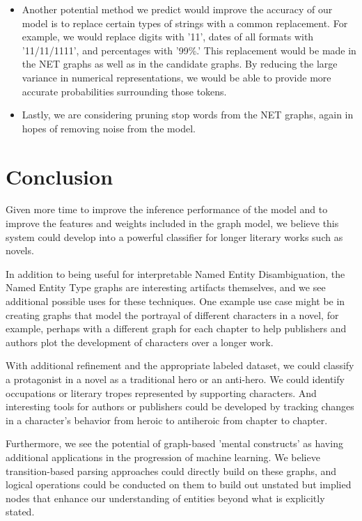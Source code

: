 \documentclass[11pt,a4paper]{article}
\begin{document}
\begin{itemize}
\item Another potential method we predict would improve the accuracy of our model is to replace certain types of strings with a common replacement. For example, we would replace digits with '11', dates of all formats with '11/11/1111', and percentages with '99\%.' This replacement would be made in the NET graphs as well as in the candidate graphs. By reducing the large variance in numerical representations, we would be able to provide more accurate probabilities surrounding those tokens.

\item Lastly, we are considering pruning stop words from the NET graphs, again in hopes of removing noise from the model.

\end{itemize}

\section{Conclusion}

Given more time to improve the inference performance of the model and to improve the features and weights included in the graph model, we believe this system could develop into a powerful classifier for longer literary works such as novels.

In addition to being useful for interpretable Named Entity Disambiguation, the Named Entity Type graphs are interesting artifacts themselves, and we see additional possible uses for these techniques. One example use case might be in creating graphs that model the portrayal of different characters in a novel, for example, perhaps with a different graph for each chapter to help publishers and authors plot the development of characters over a longer work.

With additional refinement and the appropriate labeled dataset, we could classify a protagonist in a novel as a traditional hero or an anti-hero. We could identify occupations or literary tropes represented by supporting characters. And interesting tools for authors or publishers could be developed by tracking changes in a character's behavior from heroic to antiheroic from chapter to chapter.\cite{LampleNeuralArchitecturesNamed2016}

Furthermore, we see the potential of graph-based 'mental constructs' as having additional applications in the progression of machine learning. We believe transition-based parsing approaches could directly build on these graphs, and logical operations could be conducted on them to build out unstated but implied nodes that enhance our understanding of entities beyond what is explicitly stated. \cite{NivreIncrementalityDeterministicDependency2004}

%
%


\end{document}
